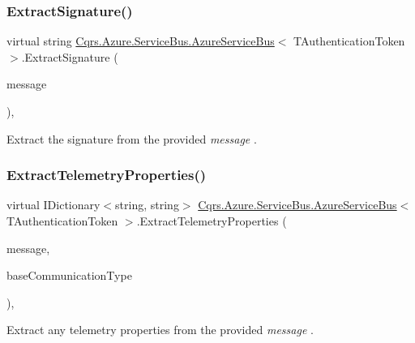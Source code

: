\subsubsection{\texorpdfstring{Extract\+Signature()}{ExtractSignature()}}
{\footnotesize\ttfamily virtual string \hyperlink{classCqrs_1_1Azure_1_1ServiceBus_1_1AzureServiceBus}{Cqrs.\+Azure.\+Service\+Bus.\+Azure\+Service\+Bus}$<$ T\+Authentication\+Token $>$.Extract\+Signature (\begin{DoxyParamCaption}\item[{Brokered\+Message}]{message }\end{DoxyParamCaption})\hspace{0.3cm}{\ttfamily [protected]}, {\ttfamily [virtual]}}



Extract the signature from the provided {\itshape message} . 

\mbox{\label{classCqrs_1_1Azure_1_1ServiceBus_1_1AzureServiceBus_a735e3fddc6abec6a7eaa76acde57f46a_a735e3fddc6abec6a7eaa76acde57f46a}} 
\subsubsection{\texorpdfstring{Extract\+Telemetry\+Properties()}{ExtractTelemetryProperties()}}
{\footnotesize\ttfamily virtual I\+Dictionary$<$string, string$>$ \hyperlink{classCqrs_1_1Azure_1_1ServiceBus_1_1AzureServiceBus}{Cqrs.\+Azure.\+Service\+Bus.\+Azure\+Service\+Bus}$<$ T\+Authentication\+Token $>$.Extract\+Telemetry\+Properties (\begin{DoxyParamCaption}\item[{Brokered\+Message}]{message,  }\item[{string}]{base\+Communication\+Type }\end{DoxyParamCaption})\hspace{0.3cm}{\ttfamily [protected]}, {\ttfamily [virtual]}}



Extract any telemetry properties from the provided {\itshape message} . 

